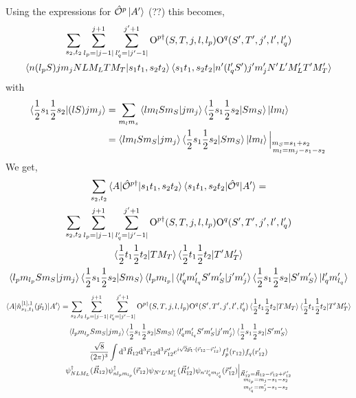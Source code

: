 \documentclass[10pt]{article}
\begin{document}
Using the expressions for $ \hat{ \mathcal{O}}^{p}  \ket{ A'} $ (??) this becomes,
\begin{multline*}
	 \sum_{s_2,t_2} \sum_{l_p = |j-1|}^{j+1} \sum_{l_q' = |j' - 1|}^{j'+1} \text{O}^{p \dagger}(S,T,j,l,l_p) \text{O}^{q}(S',T',j',l',l_q') \\
	 \braket{ n (l_p S) j m_j N L M_L T M_T | s_1 t_1, s_2 t_2} \braket{ s_1 t_1, s_2 t_2 | n' (l_q' S') j' m_j' N' L' M_L' T' M_T'} \\
\end{multline*}
with
\begin{align*}
	\braket{ \frac{1}{2} s_1 \frac{1}{2} s_2 | (l S) j m_j} &= \sum_{m_l m_s} \braket{ l m_l S m_S | j m_j } \braket{   \frac{1}{2} s_1 \frac{1}{2} s_2 | S m_S} \ket{ l m_l} \\
	&= \braket{ l m_l S m_S | j m_j } \braket{   \frac{1}{2} s_1 \frac{1}{2} s_2 | S m_S} \ket{ l m_l} \Big|_{ \substack{ m_S = s_1 + s_2 \phantom{ + m_j} \\ m_l = m_j - s_1 - s_2} }
\end{align*}
We get,
\begin{multline*}
\sum_{s_2,t_2} \braket{ A | \hat{\mathcal{O}}^{p\dagger} | s_1 t_1, s_2 t_2} \braket{ s_1 t_1, s_2 t_2 | \hat{ \mathcal{O}}^{q} | A'} = \\
 \sum_{s_2,t_2} \sum_{l_p = |j-1|}^{j+1} \sum_{l_q' = |j' - 1|}^{j'+1} \text{O}^{p \dagger}(S,T,j,l,l_p) \text{O}^{q}(S',T',j',l',l_q') \\
 	\braket{ \frac{1}{2} t_1 \frac{1}{2} t_2 | T M_T } \braket{ \frac{1}{2} t_1 \frac{1}{2} t_2 | T' M_T'} \\
	\braket{ l_p  m_{l_p} S m_S | j m_j } \braket{   \frac{1}{2} s_1 \frac{1}{2} s_2 | S m_S} \bra{ l_p m_{l_p} }
	\braket{ l_q' m_{l_q}' S' m_S' | j' m_j' } \braket{   \frac{1}{2} s_1 \frac{1}{2} s_2 | S' m_S'} \ket{ l_q' m_{l_q}'}
\end{multline*}
\begin{multline*}
	\braket{ A | \hat{n}_{s_1,t_1}^{[1],1}(\vec{p}_1) | A'} =  \sum_{s_2,t_2} \sum_{l_p = |j-1|}^{j+1} \sum_{l_q' = |j' - 1|}^{j'+1} \text{O}^{p\dagger}(S,T,j,l,l_p) \text{O}^{q}(S',T',j',l',l_q') \braket{ \frac{1}{2} t_1 \frac{1}{2} t_2 | T M_T } \braket{ \frac{1}{2} t_1 \frac{1}{2} t_2 | T' M_T'} \\
	\braket{ l_p  m_{l_p} S m_S | j m_j } \braket{   \frac{1}{2} s_1 \frac{1}{2} s_2 | S m_S} 
	\braket{ l_q' m_{l_q}' S' m_S' | j' m_j' } \braket{   \frac{1}{2} s_1 \frac{1}{2} s_2 | S' m_S'} \\
 \frac{\sqrt{8}}{(2 \pi)^{3}} \int \text{d}^{3} \vec{R}_{12} \text{d}^{3} \vec{r}_{12} \text{d}^{3} \vec{r}_{12}^{\, \prime}  e^{ i \sqrt{2} \vec{p}_{1} \cdot ( \vec{r}_{12} - \vec{r}_{12}^{\, \prime}) } f_{p}^{\dagger}(r_{12}) f_{q}(r_{12}') \\
   \psi_{N L M_L}^{\dagger}(\vec{R}_{12}) \psi_{ n l_p m_{l_p} }^{\dagger}(\vec{r}_{12}) \psi_{N' L' M_L'}(\vec{R}_{12}^{\, \prime}) \psi_{ n' l_q' m_{l_q'} } (\vec{r}_{12}^{\, \prime}) \Big|_{ \substack{ \vec{R}_{12}^{\, \prime} = \vec{R}_{12} - \vec{r}_{12}  + \vec{r}_{12}^{\, \prime} \\ m_{l_p} = m_j - s_1 - s_2 \\ m_{l_q'} = m_j' - s_1 - s_2 }}
\end{multline*}
\end{document}
